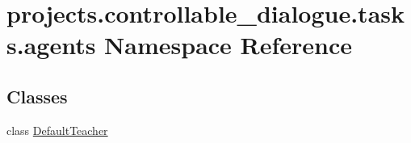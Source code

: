 \hypertarget{namespaceprojects_1_1controllable__dialogue_1_1tasks_1_1agents}{}\section{projects.\+controllable\+\_\+dialogue.\+tasks.\+agents Namespace Reference}
\label{namespaceprojects_1_1controllable__dialogue_1_1tasks_1_1agents}
\subsection*{Classes}
\begin{DoxyCompactItemize}
\item 
class \hyperlink{classprojects_1_1controllable__dialogue_1_1tasks_1_1agents_1_1DefaultTeacher}{Default\+Teacher}
\end{DoxyCompactItemize}
